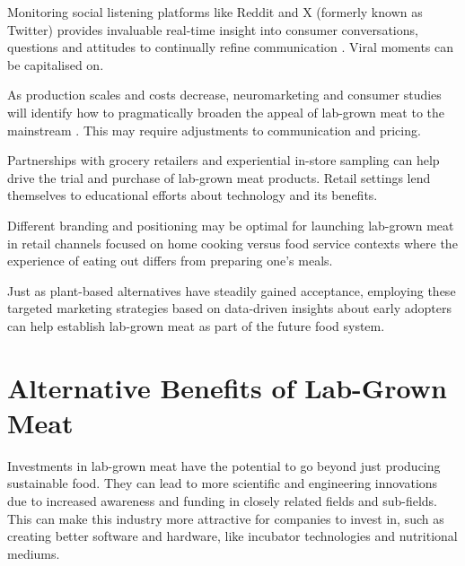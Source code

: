 \documentclass[10pt]{article}
\begin{document}
\begin{sloppypar}
  Monitoring social listening platforms like Reddit and X (formerly known as Twitter) provides invaluable real-time insight into consumer conversations, questions and attitudes to continually refine communication \citep{verbeke_would_2015}. Viral moments can be capitalised on.

  As production scales and costs decrease, neuromarketing and consumer studies will identify how to pragmatically broaden the appeal of lab-grown meat to the mainstream \citep{verbeke_would_2015}. This may require adjustments to communication and pricing.

  Partnerships with grocery retailers and experiential in-store sampling can help drive the trial and purchase of lab-grown meat products. Retail settings lend themselves to educational efforts about technology and its benefits.

  Different branding and positioning may be optimal for launching lab-grown meat in retail channels focused on home cooking versus food service contexts where the experience of eating out differs from preparing one’s meals.

  Just as plant-based alternatives have steadily gained acceptance, employing these targeted marketing strategies based on data-driven insights about early adopters can help establish lab-grown meat as part of the future food system.

  \section{Alternative Benefits of Lab-Grown Meat}
  \label{sec:alternative-benefits}

  Investments in lab-grown meat have the potential to go beyond just producing sustainable food. They can lead to more scientific and engineering innovations due to increased awareness and funding in closely related fields and sub-fields. This can make this industry more attractive for companies to invest in, such as creating better software and hardware, like incubator technologies and nutritional mediums.


\end{sloppypar}
\end{document}
